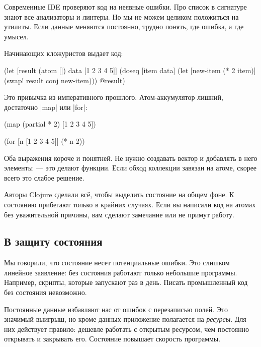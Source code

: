 Современные IDE проверяют код на неявные ошибки. Про список в сигнатуре знают
все анализаторы и линтеры. Но мы не можем целиком положиться на утилиты. Если
данные меняются постоянно, трудно понять, где ошибка, а где умысел.

Начинающих кложуристов выдает код:

\begin{english}
  \begin{clojure}
(let [result (atom [])
      data [1 2 3 4 5]]
  (doseq [item data]
    (let [new-item (* 2 item)]
      (swap! result conj new-item)))
  @result)
  \end{clojure}
\end{english}


\noindent
Это привычка из императивного прошлого. Атом-аккумулятор лишний, достаточно
\spverb|map| или \spverb|for|:

\begin{english}
  \begin{clojure}
(map (partial * 2) [1 2 3 4 5])

(for [n [1 2 3 4 5]]
  (* n 2))
  \end{clojure}
\end{english}

Оба выражения короче и понятней. Не нужно создавать вектор и добавлять в него
элементы~--- это делают функции. Если обход коллекции завязан на
атоме, скорее всего это слабое решение.

Авторы Clojure сделали вс\"{е}, чтобы выделить состояние на общем фоне. К
состоянию прибегают только в крайних случаях. Если вы написали код на атомах без
уважительной причины, вам сделают замечание или не примут работу.


\subsection{В защиту состояния}

Мы говорили, что состояние несет потенциальные ошибки. Это слишком линейное
заявление: без состояния работают только небольшие программы. Например, скрипты,
которые запускают раз в день. Писать промышленный код без состояния невозможно.


Постоянные данные избавляют нас от ошибок с перезаписью полей. Это значимый
выигрыш, но кроме данных приложение полагается на \emph{ресурсы}. Для них
действует правило: дешевле работать с открытым ресурсом, чем постоянно открывать
и закрывать его. Состояние повышает скорость программы.

